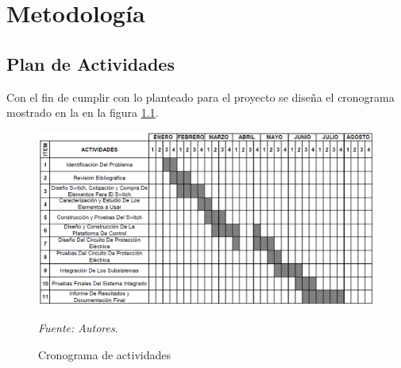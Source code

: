 
\chapter{Metodología}
\section{Plan de Actividades}

Con el fin de cumplir con lo planteado para el proyecto se diseña el cronograma mostrado en la en la figura \ref{fig:Crono}.

\begin{figure}[ht!]
\begin{centering}
\includegraphics [trim = 0mm 0mm 0mm 0mm, clip,angle=0,scale=0.50]{Images/cronograma.png}%
\caption{\label{fig:Crono}Cronograma de actividades}
\textit{Fuente: Autores}. 
\par\end{centering}
\end{figure}


